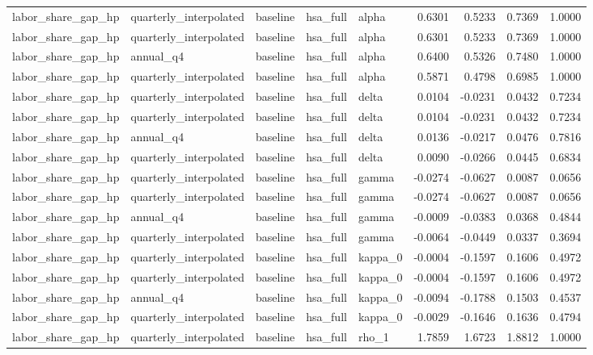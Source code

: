 \begin{tabular}{lllllrrrr}
labor\_share\_gap\_hp & quarterly\_interpolated & baseline & hsa\_full & alpha & 0.6301 & 0.5233 & 0.7369 & 1.0000 \\
labor\_share\_gap\_hp & quarterly\_interpolated & baseline & hsa\_full & alpha & 0.6301 & 0.5233 & 0.7369 & 1.0000 \\
labor\_share\_gap\_hp & annual\_q4 & baseline & hsa\_full & alpha & 0.6400 & 0.5326 & 0.7480 & 1.0000 \\
labor\_share\_gap\_hp & quarterly\_interpolated & baseline & hsa\_full & alpha & 0.5871 & 0.4798 & 0.6985 & 1.0000 \\
labor\_share\_gap\_hp & quarterly\_interpolated & baseline & hsa\_full & delta & 0.0104 & -0.0231 & 0.0432 & 0.7234 \\
labor\_share\_gap\_hp & quarterly\_interpolated & baseline & hsa\_full & delta & 0.0104 & -0.0231 & 0.0432 & 0.7234 \\
labor\_share\_gap\_hp & annual\_q4 & baseline & hsa\_full & delta & 0.0136 & -0.0217 & 0.0476 & 0.7816 \\
labor\_share\_gap\_hp & quarterly\_interpolated & baseline & hsa\_full & delta & 0.0090 & -0.0266 & 0.0445 & 0.6834 \\
labor\_share\_gap\_hp & quarterly\_interpolated & baseline & hsa\_full & gamma & -0.0274 & -0.0627 & 0.0087 & 0.0656 \\
labor\_share\_gap\_hp & quarterly\_interpolated & baseline & hsa\_full & gamma & -0.0274 & -0.0627 & 0.0087 & 0.0656 \\
labor\_share\_gap\_hp & annual\_q4 & baseline & hsa\_full & gamma & -0.0009 & -0.0383 & 0.0368 & 0.4844 \\
labor\_share\_gap\_hp & quarterly\_interpolated & baseline & hsa\_full & gamma & -0.0064 & -0.0449 & 0.0337 & 0.3694 \\
labor\_share\_gap\_hp & quarterly\_interpolated & baseline & hsa\_full & kappa\_0 & -0.0004 & -0.1597 & 0.1606 & 0.4972 \\
labor\_share\_gap\_hp & quarterly\_interpolated & baseline & hsa\_full & kappa\_0 & -0.0004 & -0.1597 & 0.1606 & 0.4972 \\
labor\_share\_gap\_hp & annual\_q4 & baseline & hsa\_full & kappa\_0 & -0.0094 & -0.1788 & 0.1503 & 0.4537 \\
labor\_share\_gap\_hp & quarterly\_interpolated & baseline & hsa\_full & kappa\_0 & -0.0029 & -0.1646 & 0.1636 & 0.4794 \\
labor\_share\_gap\_hp & quarterly\_interpolated & baseline & hsa\_full & rho\_1 & 1.7859 & 1.6723 & 1.8812 & 1.0000 \\

\end{tabular}
